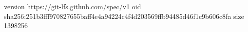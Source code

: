 version https://git-lfs.github.com/spec/v1
oid sha256:251b3fff970827655baff4e4a94224c4f4d203569ffb94485d46f1c9b606c8fa
size 1398256
